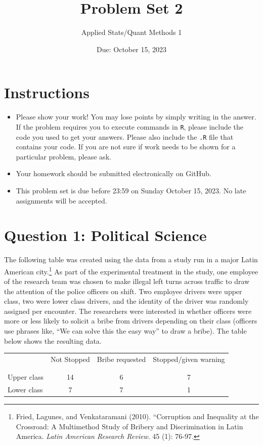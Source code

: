 \documentclass[12pt,letterpaper]{article}
\title{Problem Set 2}
\date{Due: October 15, 2023}
\author{Applied Stats/Quant Methods 1}
\begin{document}
	\maketitle
	\section*{Instructions}
\begin{itemize}
	\item Please show your work! You may lose points by simply writing in the answer. If the problem requires you to execute commands in \texttt{R}, please include the code you used to get your answers. Please also include the \texttt{.R} file that contains your code. If you are not sure if work needs to be shown for a particular problem, please ask.
	\item Your homework should be submitted electronically on GitHub.
	\item This problem set is due before 23:59 on Sunday October 15, 2023. No late assignments will be accepted.

\end{itemize}

	
	\vspace{.5cm}
	\section*{Question 1: Political Science}
		\vspace{.25cm}
	The following table was created using the data from a study run in a major Latin American city.\footnote{Fried, Lagunes, and Venkataramani (2010). ``Corruption and Inequality at the Crossroad: A Multimethod Study of Bribery and Discrimination in Latin America. \textit{Latin American Research Review}. 45 (1): 76-97.} As part of the experimental treatment in the study, one employee of the research team was chosen to make illegal left turns across traffic to draw the attention of the police officers on shift. Two employee drivers were upper class, two were lower class drivers, and the identity of the driver was randomly assigned per encounter. The researchers were interested in whether officers were more or less likely to solicit a bribe from drivers depending on their class (officers use phrases like, ``We can solve this the easy way'' to draw a bribe). The table below shows the resulting data.

\newpage
\begin{table}[h!]
	\centering
	\begin{tabular}{l | c c c }
		& Not Stopped & Bribe requested & Stopped/given warning \\
		\\[-1.8ex] 
		\hline \\[-1.8ex]
		Upper class & 14 & 6 & 7 \\
		Lower class & 7 & 7 & 1 \\
		\hline
	\end{tabular}
\end{table}
\end{document}
